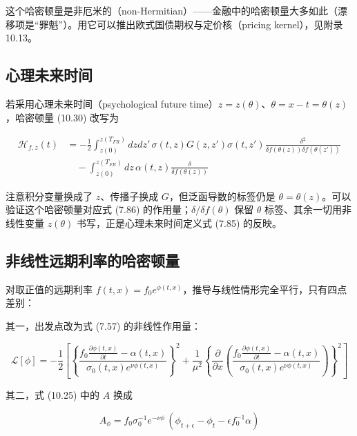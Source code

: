 这个哈密顿量是非厄米的（non-Hermitian）——金融中的哈密顿量大多如此（漂移项是“罪魁”）。用它可以推出欧式国债期权与定价核（pricing kernel），见附录 10.13。

\subsection{心理未来时间}

若采用心理未来时间（psychological future time）$z=z(\theta)$、$\theta=x-t=\theta(z)$，哈密顿量 (10.30) 改写为

\begin{equation*}
\begin{aligned}
\mathcal{H}_{f,z}(t)&=-\frac{1}{2}\int_{z(0)}^{z(T_{FR})}dzdz'\,\sigma(t,z)G(z,z')\sigma(t,z')\frac{\delta^2}{\delta f(\theta(z))\delta f(\theta(z'))}\\
&\quad-\int_{z(0)}^{z(T_{FR})}dz\,\alpha(t,z)\frac{\delta}{\delta f(\theta(z))}
\end{aligned}
\tag{10.31}
\end{equation*}

注意积分变量换成了 $z$、传播子换成 $G$，但泛函导数的标签仍是 $\theta=\theta(z)$。可以验证这个哈密顿量对应式 (7.86) 的作用量；$\delta/\delta f(\theta)$ 保留 $\theta$ 标签、其余一切用非线性变量 $z(\theta)$ 书写，正是心理未来时间定义式 (7.85) 的反映。

\subsection{非线性远期利率的哈密顿量}

对取正值的远期利率 $f(t,x)=f_0e^{\phi(t,x)}$，推导与线性情形完全平行，只有四点差别：

其一，出发点改为式 (7.57) 的非线性作用量：

\begin{equation*}
\mathcal{L}[\phi]=-\frac{1}{2}\left[\left\{\frac{f_0\frac{\partial\phi(t,x)}{\partial t}-\alpha(t,x)}{\sigma_0(t,x)e^{\nu\phi(t,x)}}\right\}^2
+\frac{1}{\mu^2}\left\{\frac{\partial}{\partial x}\left(\frac{f_0\frac{\partial\phi(t,x)}{\partial t}-\alpha(t,x)}{\sigma_0(t,x)e^{\nu\phi(t,x)}}\right)\right\}^2\right]
\end{equation*}

其二，式 (10.25) 中的 $A$ 换成

\begin{equation*}
A_\phi=f_0\sigma_0^{-1}e^{-\nu\phi}\,(\phi_{t+\epsilon}-\phi_t-\epsilon f_0^{-1}\alpha)
\end{equation*}

